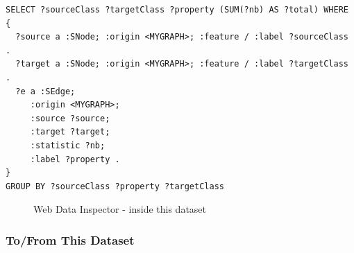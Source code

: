 \begin{verbatim}
SELECT ?sourceClass ?targetClass ?property (SUM(?nb) AS ?total) WHERE {
  ?source a :SNode; :origin <MYGRAPH>; :feature / :label ?sourceClass .
  ?target a :SNode; :origin <MYGRAPH>; :feature / :label ?targetClass .
  ?e a :SEdge;
     :origin <MYGRAPH>;
     :source ?source;
     :target ?target;
     :statistic ?nb;
     :label ?property .
}
GROUP BY ?sourceClass ?property ?targetClass
\end{verbatim}

\begin{figure}
	\centering
	\caption{Web Data Inspector - inside this dataset}
	\label{fig:wdi:insideThisDataset}
\end{figure}

\subsubsection{To/From This Dataset}

